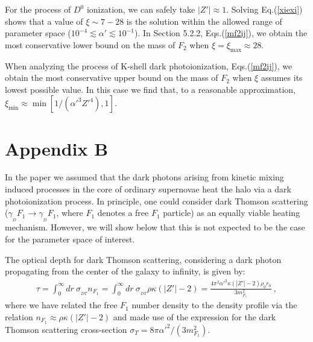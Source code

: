 \documentclass[12pt]{article}
\begin{document}
{{For the process of $D ^0$ ionization, we can safely take $|Z'| \approx 1$. Solving Eq.(\ref{xiexi}) shows that a value of $\xi \sim 7-28$ is the solution within the allowed range of parameter space ($10 ^{-4} \lesssim \alpha ' \lesssim 10 ^{-1}$). In Section 5.2.2, Eqs.(\ref{mf2ij}), we obtain the most conservative lower bound on the mass of $F_2$ when $\xi = \xi _{\max} \approx 28$.

When analyzing the process of K-shell dark photoionization, Eqs.(\ref{mf2ij}), we obtain the most conservative upper bound on the mass of $F_2$ when $\xi$ assumes its lowest possible value. In this case we find that, to a reasonable approximation, $\xi _{\min} \approx \min [1/({\alpha '} ^3{Z'} ^4),1]$.

\section*{Appendix B}

In the paper we assumed that the dark photons arising from kinetic mixing induced processes in the core of ordinary supernovae heat the halo via a dark photoionization process. In principle, one could consider dark Thomson scattering ($\gamma _{_D}F_1 \rightarrow \gamma _{_D}F_1$, where $F_1$ denotes a free $F_1$ particle) as an equally viable heating mechanism. However, we will show below that this is not expected to be the case for the parameter space of interest.

The optical depth for dark Thomson scattering, considering a dark photon propagating from the center of the galaxy to infinity, is given by:
%
\begin{eqnarray}
\tau = \int _0 ^{\infty} dr \ \sigma _{_{DT}}n _{F_1} = \int _0 ^{\infty} dr \ \sigma _{_{DT}}\rho \kappa (|Z'|-2) = \frac{4\pi ^2{\alpha '} ^2\kappa(|Z'|-2)\rho _0r _0}{3m _{F_1} ^2} \ ,
\label{opticaldepthdark}
\end{eqnarray}
%
where we have related the free $F_1$ number density to the density profile via the relation $n _{F_1} \approx \rho \kappa (|Z'|-2)$ and made use of the expression for the dark Thomson scattering cross-section $\sigma _T = 8\pi{\alpha '} ^2/(3m _{F_1} ^2)$.

}}
\end{document}
